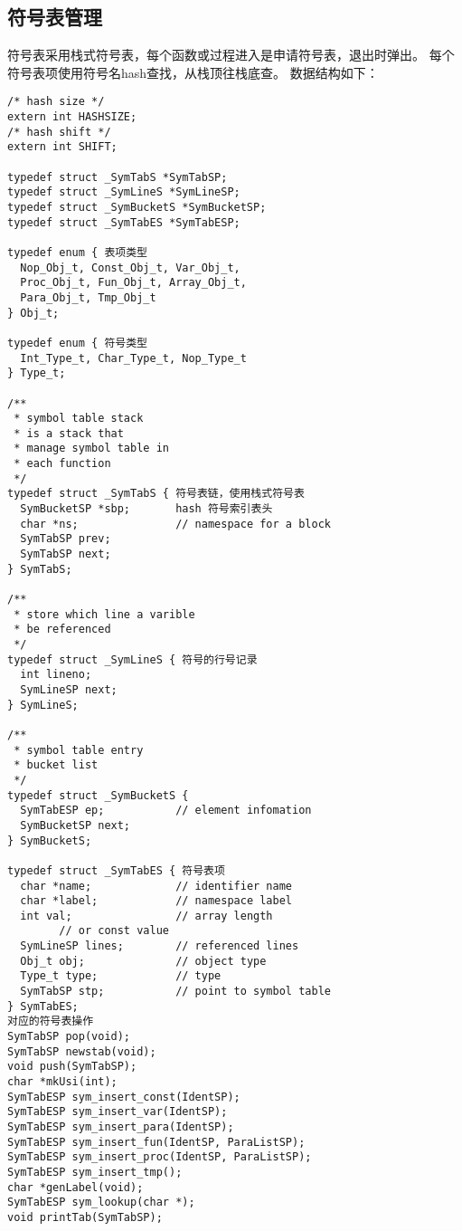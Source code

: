\subsection{符号表管理}
符号表采用栈式符号表，每个函数或过程进入是申请符号表，退出时弹出。
每个符号表项使用符号名hash查找，从栈顶往栈底查。
数据结构如下：
\begin{verbatim}
/* hash size */
extern int HASHSIZE;
/* hash shift */
extern int SHIFT;

typedef struct _SymTabS *SymTabSP;
typedef struct _SymLineS *SymLineSP;
typedef struct _SymBucketS *SymBucketSP;
typedef struct _SymTabES *SymTabESP;

typedef enum { 表项类型
  Nop_Obj_t, Const_Obj_t, Var_Obj_t,
  Proc_Obj_t, Fun_Obj_t, Array_Obj_t,
  Para_Obj_t, Tmp_Obj_t
} Obj_t;

typedef enum { 符号类型
  Int_Type_t, Char_Type_t, Nop_Type_t
} Type_t;

/**
 * symbol table stack 
 * is a stack that
 * manage symbol table in
 * each function
 */
typedef struct _SymTabS { 符号表链，使用栈式符号表
  SymBucketSP *sbp;       hash 符号索引表头
  char *ns;               // namespace for a block
  SymTabSP prev;
  SymTabSP next;
} SymTabS;

/**
 * store which line a varible
 * be referenced
 */
typedef struct _SymLineS { 符号的行号记录
  int lineno;
  SymLineSP next;
} SymLineS;

/**
 * symbol table entry 
 * bucket list
 */
typedef struct _SymBucketS {
  SymTabESP ep;           // element infomation
  SymBucketSP next;
} SymBucketS;

typedef struct _SymTabES { 符号表项
  char *name;             // identifier name
  char *label;            // namespace label
  int val;                // array length
        // or const value
  SymLineSP lines;        // referenced lines
  Obj_t obj;              // object type
  Type_t type;            // type 
  SymTabSP stp;           // point to symbol table
} SymTabES;
对应的符号表操作
SymTabSP pop(void);
SymTabSP newstab(void);
void push(SymTabSP);
char *mkUsi(int);
SymTabESP sym_insert_const(IdentSP);
SymTabESP sym_insert_var(IdentSP);
SymTabESP sym_insert_para(IdentSP);
SymTabESP sym_insert_fun(IdentSP, ParaListSP);
SymTabESP sym_insert_proc(IdentSP, ParaListSP);
SymTabESP sym_insert_tmp();
char *genLabel(void);
SymTabESP sym_lookup(char *);
void printTab(SymTabSP);
\end{verbatim}
